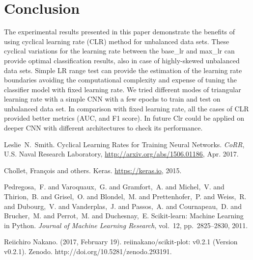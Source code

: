 \documentclass[journal, a4paper]{IEEEtran}
\begin{document}
\section{Conclusion}
The experimental results presented in this paper demonstrate the benefits of using cyclical learning rate (CLR) method for unbalanced data sets. These cyclical variations for the learning rate between the base\_lr and max\_lr can provide optimal classification results, also in case of highly-skewed unbalanced data sets. Simple LR range test can provide the estimation of the learning rate boundaries avoiding the computational complexity and expense of tuning the classifier model with fixed learning rate. We tried different modes of triangular learning rate with a simple CNN with a few epochs to train and test on unbalanced data set. In comparison with fixed learning rate, all the cases of CLR provided better metrics (AUC, and F1 score). In future Clr could be applied on deeper CNN with different architectures to check its performance.
\begin{thebibliography}{5}
    
	Leslie~N.~Smith. Cyclical Learning Rates for Training Neural Networks. {\em CoRR},
	U.S. Naval Research Laboratory, \url{http://arxiv.org/abs/1506.01186}, Apr. 2017.
    
	Chollet, Fran\c{c}ois and others. Keras. \url{https://keras.io},
    2015.

	Pedregosa,~F. and Varoquaux,~G. and Gramfort,~A. and Michel,~V.
    and Thirion,~B. and Grisel,~O. and Blondel,~M. and Prettenhofer,~P.
    and Weiss,~R. and Dubourg,~V. and Vanderplas,~J. and Passos,~A. and
    Cournapeau,~D. and Brucher,~M. and Perrot,~M. and Duchesnay,~E. Scikit-learn: Machine Learning in {P}ython. {\em Journal of Machine Learning Research},
	vol.~12, pp.~2825--2830, 2011.
	
	Reiichiro Nakano. (2017, February 19). reiinakano/scikit-plot: v0.2.1 (Version v0.2.1). Zenodo. http://doi.org/10.5281/zenodo.293191.
	
\end{thebibliography}

\end{document}
